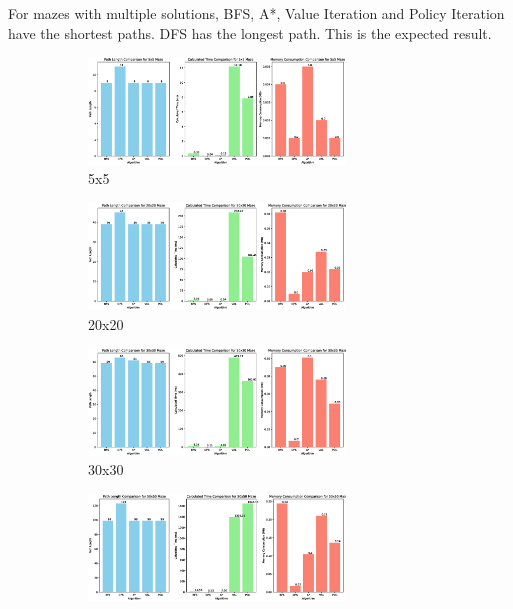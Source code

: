 \documentclass{article}
\begin{document}
For mazes with multiple solutions, BFS, A*, Value Iteration and Policy Iteration have the shortest paths. DFS has the longest path. This is the expected result.
\newpage
\begin{figure}[H]
    \centering
    \begin{subfigure}[b]{1\textwidth}
        \centering
        \includegraphics[width=0.75\textwidth]{imgs/Path-Time-Memory-5-5.eps}
        \caption{5x5}
    \end{subfigure}
    \newline
    \begin{subfigure}[b]{1\textwidth}
        \centering
        \includegraphics[width=0.75\textwidth]{imgs/Path-Time-Memory-20-20.eps}
        \caption{20x20}
    \end{subfigure}
    \newline
    \begin{subfigure}[b]{1\textwidth}
        \centering
        \includegraphics[width=0.75\textwidth]{imgs/Path-Time-Memory-30-30.eps}
        \caption{30x30}
    \end{subfigure}
    \newline
    \begin{subfigure}[b]{1\textwidth}
        \centering
        \includegraphics[width=0.75\textwidth]{imgs/Path-Time-Memory-50-50.eps}

\end{subfigure}
\end{figure}
\end{document}
